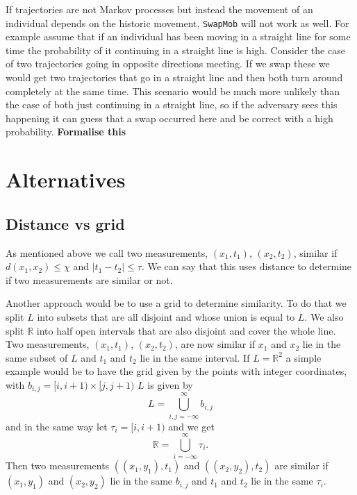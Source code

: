 \documentclass[11pt]{article}
\begin{document}
If trajectories are not Markov processes but instead the movement of
an individual depends on the historic movement, \texttt{SwapMob} will not
work as well. For example assume that if an individual has been moving
in a straight line for some time the probability of it continuing in a
straight line is high. Consider the case of two trajectories going in
opposite directions meeting. If we swap these we would get two
trajectories that go in a straight line and then both turn around
completely at the same time. This scenario would be much more unlikely
than the case of both just continuing in a straight line, so if the
adversary sees this happening it can guess that a swap occurred here
and be correct with a high probability. \textbf{Formalise this}
\section{Alternatives}
\label{sec:orgdac8846}
\subsection{Distance vs grid}
\label{sec:org4b35a4e}
As mentioned above we call two measurements, \((x_1, t_1)\), \((x_2,
t_2)\), similar if \(d(x_1, x_2) \leq \chi\) and \(|t_1 - t_2| \leq
\tau\). We can say that this uses distance to determine if two
measurements are similar or not.

Another approach would be to use a grid to determine similarity. To do
that we split \(L\) into subsets that are all disjoint and whose union
is equal to \(L\). We also split \(\mathbb{R}\) into half open
intervals that are also disjoint and cover the whole line. Two
measurements, \((x_1, t_1)\), \((x_2, t_2)\), are now similar if
\(x_1\) and \(x_2\) lie in the same subset of \(L\) and \(t_1\) and
\(t_2\) lie in the same interval. If \(L = \mathbb{R}^2\) a simple
example would be to have the grid given by the points with integer
coordinates, with \(b_{i,j} = [i, i+1) \times [j, j+1)\) \(L\) is
given by
\begin{equation}
  L = \bigcup_{i, j = -\infty}^\infty b_{i,j}
\end{equation}
and in the same way let \(\tau_i = [i, i+1)\) and we get
\begin{equation}
  \mathbb{R} = \bigcup_{i = -\infty}^\infty \tau_i.
\end{equation}
Then two measurements \(((x_1, y_1), t_1)\) and \(((x_2, y_2), t_2)\)
are similar if \((x_1, y_1)\) and \((x_2, y_2)\) lie in the same
\(b_{i,j}\) and \(t_1\) and \(t_2\) lie in the same \(\tau_i\).
\end{document}
